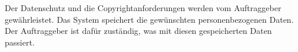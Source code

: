 \documentclass[../../Pflichtenheft.tex]{subfiles}
\begin{document}
    Der Datenschutz und die Copyrightanforderungen werden vom Auftraggeber gewährleistet.
    Das System speichert die gewünschten personenbezogenen Daten. Der Auftraggeber ist dafür zuständig, was mit diesen gespeicherten Daten passiert.
\end{document}
